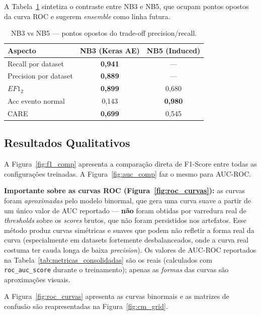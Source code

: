 \documentclass[12pt]{article}
\begin{document}
A Tabela~\ref{tab:nb3_vs_nb5} sintetiza o contraste entre NB3 e NB5, que ocupam pontos opostos da curva ROC e sugerem \textit{ensemble} como linha futura.

\begin{table}[!ht]
\centering
\small
\begin{tabular}{l|c|c}
\hline
\textbf{Aspecto} & \textbf{NB3 (Keras AE)} & \textbf{NB5 (Induced)} \\
\hline
Recall por dataset              & \textbf{0,941} & --- \\
Precision por dataset           & \textbf{0,889} & --- \\
$EF1_2$                         & \textbf{0,899} & 0,680 \\
Acc evento normal               & 0,143          & \textbf{0,980} \\
CARE                            & \textbf{0,699} & 0,545 \\
\hline
\end{tabular}
\caption{NB3 vs NB5 --- pontos opostos do trade-off precision/recall.}
\label{tab:nb3_vs_nb5}
\end{table}

\subsection{Resultados Qualitativos}

A Figura~\ref{fig:f1_comp} apresenta a comparação direta de F1-Score entre todas as configurações treinadas. A Figura~\ref{fig:auc_comp} faz o mesmo para AUC-ROC.

\textbf{Importante sobre as curvas ROC (Figura~\ref{fig:roc_curvas}):} as curvas foram \emph{aproximadas} pelo modelo binormal, que gera uma curva suave a partir de um único valor de AUC reportado --- \textbf{não} foram obtidas por varredura real de \textit{thresholds} sobre os \textit{scores} brutos, que não foram persistidos nos artefatos. Esse método produz curvas simétricas e suaves que podem não refletir a forma real da curva (especialmente em datasets fortemente desbalanceados, onde a curva real costuma ter cauda longa de baixa \textit{precision}). Os valores de AUC-ROC reportados na Tabela~\ref{tab:metricas_consolidadas} são os reais (calculados com \texttt{roc\_auc\_score} durante o treinamento); apenas as \emph{formas} das curvas são aproximações visuais.

A Figura~\ref{fig:roc_curvas} apresenta as curvas binormais e as matrizes de confusão são reapresentadas na Figura~\ref{fig:cm_grid}.
\end{document}
